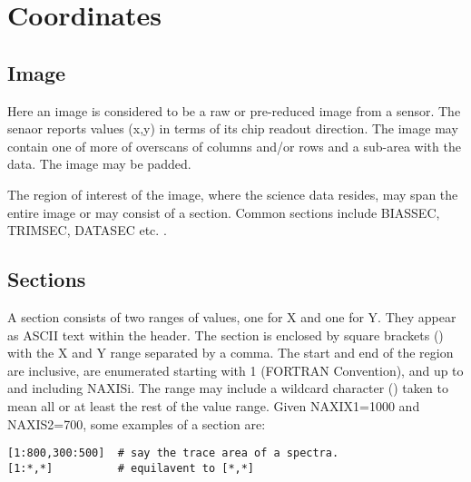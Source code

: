 \section{Coordinates}

\subsection{Image}

Here an image is considered to be a raw or pre-reduced image from a sensor.
The senaor reports values (x,y) in terms of its chip readout direction. The
image may contain one of more of overscans of columns and/or rows and a
sub-area with the data. The image may be padded. 

The region of interest of the image, where the science data resides, may
span the entire image or may consist of a section. Common sections include
BIASSEC, TRIMSEC, DATASEC etc.   
.

\subsection{Sections}

A section consists of two ranges of values, one for X and one for Y. They
appear as ASCII text within the header. The section is enclosed by square
brackets (\dhl{[]}) with the X and Y range separated by a comma. The
start and end of the region are inclusive, are enumerated starting with
1 (FORTRAN Convention), and up to and including NAXISi. The range may include
a wildcard character (\dhl{*}) taken to mean all or at least the rest of
the value range. Given NAXIX1=1000 and NAXIS2=700, some examples of a
section are:

\begingroup \fontsize{10pt}{10pt}
\selectfont
\begin{verbatim} 
[1:800,300:500]  # say the trace area of a spectra.
[1:*,*]          # equilavent to [*,*]
\end{verbatim}
\endgroup

